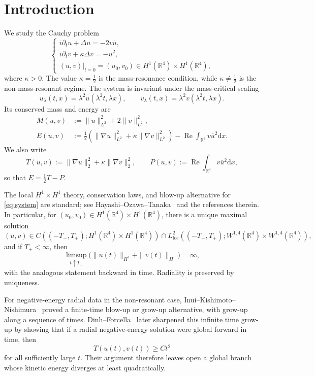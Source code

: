 \documentclass[12pt]{amsart}
\numberwithin{equation}{section}
\theoremstyle{remark}
\newcommand{\R}{\mathbb{R}}
\newcommand{\dd}{\mathrm{d}x}
\newcommand{\re}{\operatorname{Re}}
\begin{document}
\section{Introduction}
\setcounter{equation}{0}
We study the Cauchy problem
\begin{equation}\label{eq:system}
\begin{cases}
 i\partial_t u+\Delta u=-2v\overline{u},\\
 i\partial_t v+\kappa\Delta v=-u^2,\\
 (u,v)|_{t=0}=(u_0,v_0)\in H^1(\R^4)\times H^1(\R^4),
\end{cases}
\end{equation}
where $\kappa>0$.  The value $\kappa=\frac12$ is the mass-resonance condition, while $\kappa\neq\frac12$ is the non-mass-resonant regime.  The system is invariant under the mass-critical scaling
\begin{equation*}
 u_\lambda(t,x)=\lambda^2u(\lambda^2t,\lambda x), \qquad v_\lambda(t,x)=\lambda^2v(\lambda^2t,\lambda x).
\end{equation*}
Its conserved mass and energy are
\begin{align}
 M(u,v)&:=\|u\|_{L^2}^2+2\|v\|_{L^2}^2,\tag{mass}\\
 E(u,v)&:=\frac12\left(\|\nabla u\|_{L^2}^2+\kappa\|\nabla v\|_{L^2}^2\right)
 -\re\int_{\R^4}v\overline{u}^{2}\dd.\tag{energy}
\end{align}
We also write
\begin{equation*}
 T(u,v):=\|\nabla u\|_2^2+\kappa\|\nabla v\|_2^2, \qquad P(u,v):=\re\int_{\R^4}v\overline{u}^{2}\dd,
\end{equation*}
so that $E=\frac12T-P$.

The local $H^1\times H^1$ theory, conservation laws, and blow-up alternative for \eqref{eq:system} are standard; see Hayashi--Ozawa--Tanaka~\cite{HOT} and the references therein.  In particular, for $(u_0,v_0)\in H^1(\R^4) \times H^1(\R^4)$, there is a unique maximal solution
\[
 (u,v)\in C((-T_-,T_+);H^1(\R^4)\times H^1(\R^4)) \cap L^2_{\textrm{loc}}((-T_-,T_+); W^{1,4}(\R^4)\times W^{1,4}(\R^4)),
\]
and if $T_+<\infty$, then
\begin{equation}\label{eq:blowup-alternative}
\limsup_{t\uparrow T_+}\big(\|u(t)\|_{H^1}+\|v(t)\|_{H^1}\big)=\infty,
\end{equation}
with the analogous statement backward in time. Radiality is preserved by uniqueness.

For negative-energy radial data in the non-resonant case, Inui--Kishimoto--Nishimura~\cite{IKN} proved a finite-time blow-up or grow-up alternative, with grow-up along a sequence of times. Dinh--Forcella~\cite{DF} later sharpened this infinite time grow-up by showing that if a radial negative-energy solution were global forward in time, then
\begin{equation}\label{eq:DF-growup}
 T(u(t),v(t))\ge Ct^2
\end{equation}
for all sufficiently large $t$. Their argument therefore leaves open a global branch whose kinetic energy diverges at least quadratically.
\end{document}
